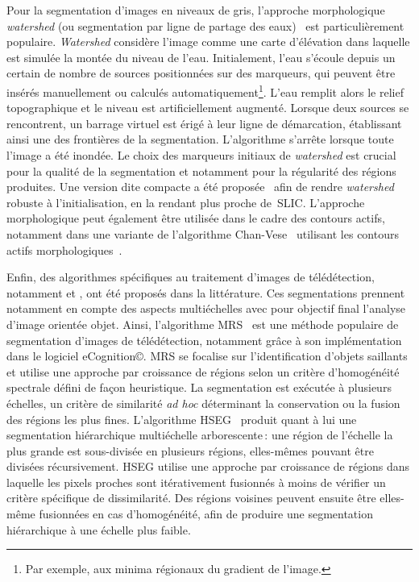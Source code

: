 Pour la segmentation d'images en niveaux de gris, l'approche morphologique \emph{watershed} (ou segmentation par ligne de partage des eaux)~\cite{beucher_morphological_1993} est particulièrement populaire. \emph{Watershed} considère l'image comme une carte d'élévation dans laquelle est simulée la montée du niveau de l'eau. Initialement, l'eau s'écoule depuis un certain de nombre de sources positionnées sur des marqueurs, qui peuvent être insérés manuellement ou calculés automatiquement\footnote{Par exemple, aux minima régionaux du gradient de l'image.}. L'eau remplit alors le relief topographique et le niveau est artificiellement augmenté. Lorsque deux sources se rencontrent, un barrage virtuel est érigé à leur ligne de démarcation, établissant ainsi une des frontières de la segmentation. L'algorithme s'arrête lorsque toute l'image a été inondée. Le choix des marqueurs initiaux de \emph{watershed} est crucial pour la qualité de la segmentation et notamment pour la régularité des régions produites. Une version dite compacte a été proposée~\cite{neubert_compact_2014} afin de rendre \emph{watershed} robuste à l'initialisation, en la rendant plus proche de~\gls{SLIC}. L'approche morphologique peut également être utilisée dans le cadre des contours actifs, notamment dans une variante de l'algorithme Chan-Vese~\cite{chan_active_1999} utilisant les contours actifs morphologiques~\cite{marquez-neila_morphological_2014}.

Enfin, des algorithmes spécifiques au traitement d'images de télédétection, notamment  et , ont été proposés dans la littérature. Ces segmentations prennent notamment en compte des aspects multiéchelles avec pour objectif final l'analyse d'image orientée objet. Ainsi, l'algorithme \gls{MRS}~\cite{baatz_multiresolution_2000} est une méthode populaire de segmentation d'images de télédétection, notamment grâce à son implémentation dans le logiciel eCognition\copyright. \gls{MRS} se focalise sur l'identification d'objets saillants et utilise une approche par croissance de régions selon un critère d'homogénéité spectrale défini de façon heuristique. La segmentation est exécutée à plusieurs échelles, un critère de similarité \emph{ad hoc} déterminant la conservation ou la fusion des régions les plus fines.
L'algorithme \gls{HSEG}~\cite{tilton_best_2012} produit quant à lui une segmentation hiérarchique multiéchelle arborescente\,: une région de l'échelle la plus grande est sous-divisée en plusieurs régions, elles-mêmes pouvant être divisées récursivement. \gls{HSEG} utilise une approche par croissance de régions dans laquelle les pixels proches sont itérativement fusionnés à moins de vérifier un critère spécifique de dissimilarité. Des régions voisines peuvent ensuite être elles-même fusionnées en cas d'homogénéité, afin de produire une segmentation hiérarchique à une échelle plus faible.


